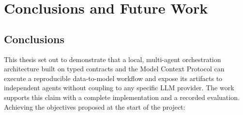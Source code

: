 \chapter{Conclusions and Future Work}
\label{ch:conclusions}

\section{Conclusions}

This thesis set out to demonstrate that a local, multi-agent orchestration architecture built on typed contracts and the Model Context Protocol can execute a reproducible data-to-model workflow and expose its artifacts to independent agents without coupling to any specific LLM provider. The work supports this claim with a complete implementation and a recorded evaluation. Achieving the objectives proposed at the start of the project:

